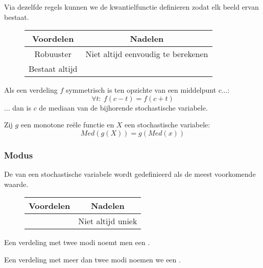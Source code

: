 \documentclass[main.tex]{subfiles}
\begin{document}
\begin{opm}
  Via dezelfde regels kunnen we de kwantielfunctie definieren zodat elk beeld ervan bestaat.
\end{opm}

\begin{figure}[H]
  \centering
  \begin{tabular}{|c|c|}
    \hline
    Voordelen & Nadelen\\
    \hline \hline
    Robuuster & Niet altijd eenvoudig te berekenen\\
    Bestaat altijd  &\\
    \hline
  \end{tabular}
\end{figure}

\begin{st}
  Als een verdeling $f$ symmetrisch is ten opzichte van een middelpunt $c$...:
  \[ \forall t:\ f(c-t) = f(c+t) \]
  ... dan is $c$ de mediaan van de bijhorende stochastische variabele.
\end{st}

\begin{st}
  Zij $g$ een monotone re\"ele functie en $X$ een stochastische variabele:
  \[ Med(g(X)) = g(Med(x)) \]
\end{st}

\subsubsection{Modus}
\label{sec:modus}

\begin{de}
  De  van een stochastische variabele wordt gedefinieerd als de meest voorkomende waarde.
\end{de}

\begin{figure}[H]
  \centering
  \begin{tabular}{|c|c|}
    \hline
    Voordelen & Nadelen\\
    \hline \hline
     & Niet altijd uniek\\
    \hline
  \end{tabular}
\end{figure}

\begin{de}
  Een verdeling met twee modi noemt men een .
\end{de}

\begin{de}
  Een verdeling met meer dan twee modi noemen we een .
\end{de}
\end{document}
